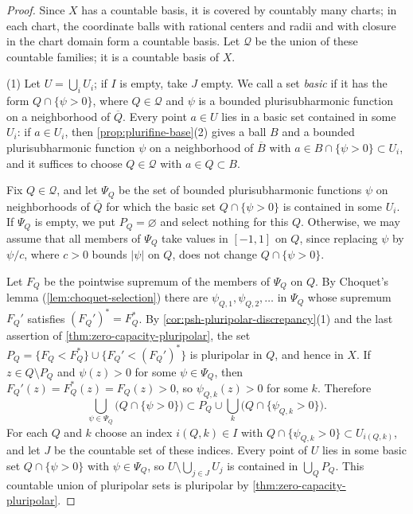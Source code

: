 \begin{proof}
Since $X$ has a countable basis, it is covered by countably many charts; in each chart, the coordinate balls with rational centers and radii and with closure in the chart domain form a countable basis. Let $\mathcal Q$ be the union of these countable families; it is a countable basis of $X$.

(1) Let $U=\bigcup_iU_i$; if $I$ is empty, take $J$ empty. We call a set \emph{basic} if it has the form $Q\cap\{\psi>0\}$, where $Q\in\mathcal Q$ and $\psi$ is a bounded plurisubharmonic function on a neighborhood of $\overline Q$. Every point $a\in U$ lies in a basic set contained in some $U_i$: if $a\in U_i$, then \cref{prop:plurifine-base}(2) gives a ball $B$ and a bounded plurisubharmonic function $\psi$ on a neighborhood of $\overline B$ with $a\in B\cap\{\psi>0\}\subset U_i$, and it suffices to choose $Q\in\mathcal Q$ with $a\in Q\subset B$.

Fix $Q\in\mathcal Q$, and let $\Psi_Q$ be the set of bounded plurisubharmonic functions $\psi$ on neighborhoods of $\overline Q$ for which the basic set $Q\cap\{\psi>0\}$ is contained in some $U_i$. If $\Psi_Q$ is empty, we put $P_Q=\varnothing$ and select nothing for this $Q$. Otherwise, we may assume that all members of $\Psi_Q$ take values in $[-1,1]$ on $Q$, since replacing $\psi$ by $\psi/c$, where $c>0$ bounds $|\psi|$ on $Q$, does not change $Q\cap\{\psi>0\}$.

Let $F_Q$ be the pointwise supremum of the members of $\Psi_Q$ on $Q$. By Choquet's lemma (\cref{lem:choquet-selection}) there are $\psi_{Q,1},\psi_{Q,2},\ldots$ in $\Psi_Q$ whose supremum $F_Q'$ satisfies $(F_Q')^*=F_Q^*$. By \cref{cor:psh-pluripolar-discrepancy}(1) and the last assertion of \cref{thm:zero-capacity-pluripolar}, the set $P_Q=\{F_Q<F_Q^*\}\cup\{F_Q'<(F_Q')^*\}$ is pluripolar in $Q$, and hence in $X$. If $z\in Q\setminus P_Q$ and $\psi(z)>0$ for some $\psi\in\Psi_Q$, then $F_Q'(z)=F_Q^*(z)=F_Q(z)>0$, so $\psi_{Q,k}(z)>0$ for some $k$. Therefore
\[
 \bigcup_{\psi\in\Psi_Q}\bigl(Q\cap\{\psi>0\}\bigr)\subset P_Q\cup\bigcup_k\bigl(Q\cap\{\psi_{Q,k}>0\}\bigr).
\]
For each $Q$ and $k$ choose an index $i(Q,k)\in I$ with $Q\cap\{\psi_{Q,k}>0\}\subset U_{i(Q,k)}$, and let $J$ be the countable set of these indices. Every point of $U$ lies in some basic set $Q\cap\{\psi>0\}$ with $\psi\in\Psi_Q$, so $U\setminus\bigcup_{j\in J}U_j$ is contained in $\bigcup_QP_Q$. This countable union of pluripolar sets is pluripolar by \cref{thm:zero-capacity-pluripolar}.


\end{proof}
